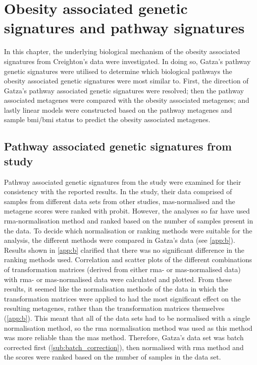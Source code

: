 \chapter{Obesity associated genetic signatures and pathway signatures}
\label{cha:obesity_associated_genetic_signature_and_pathway_signatures}

In this chapter, the underlying biological mechanism of the obesity associated signatures from Creighton's data were investigated.
In doing so, Gatza's pathway genetic signatures were utilised to determine which biological pathways the obesity associated genetic signatures were most similar to.
First, the direction of Gatza's pathway associated genetic signatures were resolved; then the pathway associated metagenes were compared with the obesity associated metagenes; and lastly linear models were constructed based on the pathway metagenes and sample \gls{bmi}/\gls{bmi} status to predict the obesity associated metagenes.

\section{Pathway associated genetic signatures from \citet{Gatza2010a} study}
\label{sec:pathway_associated_genetic_signatures_from_gatza2010a_study}

Pathway associated genetic signatures from the \citet{Gatza2010a} study were examined for their consistency with the reported results.
In the \citet{Gatza2010a} study, their data comprised of samples from different data sets from other studies, \gls{mas}-normalised and the metagene scores were ranked with probit.
However, the analyses so far have used \gls{rma}-normalisation method and ranked based on the number of samples present in the data.
To decide which normalisation or ranking methods were suitable for the analysis, the different methods were compared in Gatza's data (see \cref{app:b}).
Results shown in \cref{app:b} clarified that there was no significant difference in the ranking methods used.
Correlation and scatter plots of the different combinations of transformation matrices (derived from either \gls{rma}- or \gls{mas}-normalised data) with \gls{rma}- or \gls{mas}-normalised data were calculated and plotted.
From these results, it seemed like the normalisation methods of the data in which the transformation matrices were applied to had the most significant effect on the resulting metagenes, rather than the transformation matrices themselves (\cref{app:b}).
This meant that all of the data sets had to be normalised with a single normalisation method, so the \gls{rma} normalisation method was used as this method was more reliable than the \gls{mas} method.
Therefore, Gatza's data set was batch corrected first (\cref{sub:batch_correction}), then normalised with \gls{rma} method and the scores were ranked based on the number of samples in the data set.

